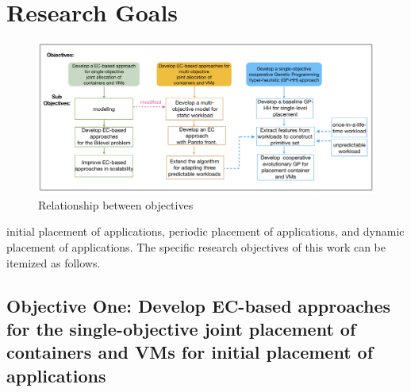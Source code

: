 \section{Research Goals}

\begin{figure}
	\centering
	\includegraphics[width=\textwidth]{pics/thesisPlan.png}
	\caption{Relationship between objectives}
	\label{fig:objectives}
\end{figure}
 initial placement of applications, periodic placement of applications, and dynamic placement of applications. The specific research objectives of this work can be itemized as follows.

\subsection{Objective One: Develop EC-based approaches for the single-objective joint placement of containers and VMs for initial placement of applications}
\label{sec:obj1}


